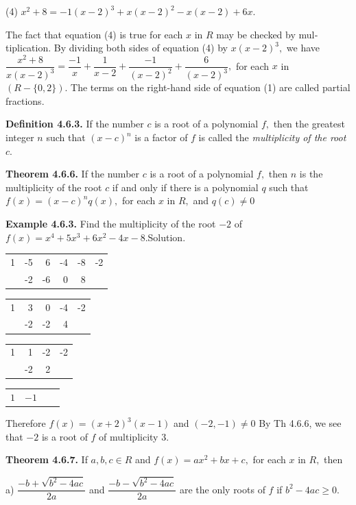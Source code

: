 (4) $x^{2} + 8= -1(x-2)^{3} + x(x-2)^{2} - x(x - 2) + 6x.$\nl

The fact that equation (4) is true for each $x$ in $R$ may be checked by mul­tiplication. By dividing both sides of equation (4) by $x(x-2)^{3},$ we have \nl
$\dfrac{x^{2} + 8}{x(x - 2)^{3}}= \dfrac{-1}{x} + \dfrac{1}{x - 2} + \dfrac{-1}{(x - 2)^{2}}  + \dfrac{6}{(x - 2)^{3}},$\nl
for each $x$ in $(R-\{0, 2 \}).$  The terms on the right-hand side of equation (1) are called partial fractions. \nl

\textbf{Definition 4.6.3.} If the number $c$ is a root of a polynomial $f,$ then the greatest integer $n$ such that $(x - c)^{n}$ is a factor of $f$ is called the \textit{multiplicity of the root} $c.$\nl

\newpage

\textbf{Theorem 4.6.6.} If the number $c$ is a root of a polynomial $f,$ then $n$ is the multiplicity of the
root $c$ if and only if there is a polynomial $q$ such that $f(x)=( x - c)^{n}q(x),$ for each $x$ in $R,$ and
$q(c) \neq 0$

\textbf{Example 4.6.3.} Find the multiplicity of the root $-2$ of $f(x) =x^{4} + 5x^{3} + 6x^{2} -4x -8.$\nl Solution. \nl

\begin{tabular}{rrrrr|l}
1&-5&6&-4&-8&-2\\
&-2&-6&0&8&\\
\end{tabular}\nl
\begin{tabular}{rrrr|l}\hline
1&$~3$&$~$0&-4&-2\\
&-2&-2&4&\\
\end{tabular}\nl
\begin{tabular}{rrr|l}\hline
1&1&-2&-2\\
&-2&2&\\
\end{tabular}\nl
\begin{tabular}{rrl}\hline
$1$&$-1$&$~~~~$\\
\end{tabular}

Therefore $f(x)=(x+2)^{3}(x-1)$ and $(-2,-1) \neq 0$ By Th 4.6.6, we see that $-2$ is a root of $f$ of
multiplicity 3. \nl

\textbf{Theorem 4.6.7.} If $a,b,c\in R$ and $f(x)=ax^{2} + bx + c,$ for each $x$ in $R,$ then

a) $\dfrac{-b + \sqrt{b^{2} - 4ac}}{2a}$ and $\dfrac{-b - \sqrt{b^{2}- 4ac}}{2a}$ are the only roots of $f$
if $b^{2} - 4ac \geq 0.$\nl

